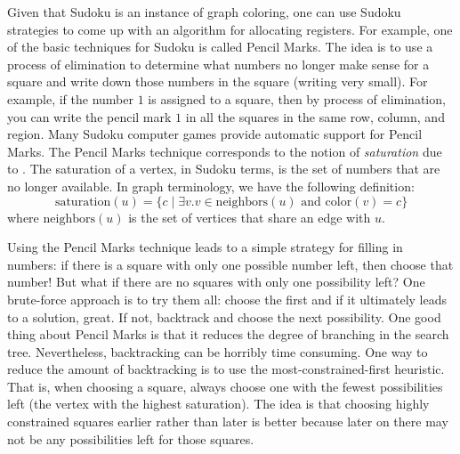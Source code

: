 \documentclass[11pt]{book}
\begin{document}
Given that Sudoku is an instance of graph coloring, one can use Sudoku
strategies to come up with an algorithm for allocating registers. For
example, one of the basic techniques for Sudoku is called Pencil
Marks. The idea is to use a process of elimination to determine what
numbers no longer make sense for a square and write down those
numbers in the square (writing very small). For example, if the number
$1$ is assigned to a square, then by process of elimination, you can
write the pencil mark $1$ in all the squares in the same row, column,
and region. Many Sudoku computer games provide automatic support for
Pencil Marks.
%
The Pencil Marks technique corresponds to the notion of
\emph{saturation} due to \cite{Brelaz:1979eu}.
The saturation of a
vertex, in Sudoku terms, is the set of numbers that are no longer
available. In graph terminology, we have the following definition:
\begin{equation*}
  \mathrm{saturation}(u) = \{ c \;|\; \exists v. v \in \mathrm{neighbors}(u)
     \text{ and } \mathrm{color}(v) = c \}
\end{equation*}
where $\mathrm{neighbors}(u)$ is the set of vertices that share an
edge with $u$.

Using the Pencil Marks technique leads to a simple strategy for
filling in numbers: if there is a square with only one possible number
left, then choose that number! But what if there are no squares with
only one possibility left? One brute-force approach is to try them
all: choose the first  and if it ultimately leads to a solution,
great.  If not, backtrack and choose the next possibility.  One good
thing about Pencil Marks is that it reduces the degree of branching in
the search tree. Nevertheless, backtracking can be horribly time
consuming. One way to reduce the amount of backtracking is to use the
most-constrained-first heuristic. That is, when choosing a square,
always choose one with the fewest possibilities left (the vertex with
the highest saturation).  The idea is that choosing highly constrained
squares earlier rather than later is better because later on there may
not be any possibilities left for those squares.
\end{document}
